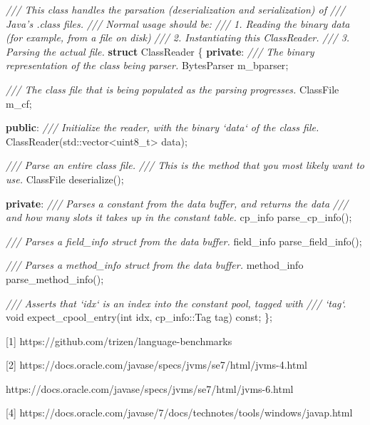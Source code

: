 \documentclass[]{article}
\newenvironment{Shaded}{}{}
\newcommand{\KeywordTok}[1]{\textcolor[rgb]{0.00,0.44,0.13}{\textbf{#1}}}
\newcommand{\DataTypeTok}[1]{\textcolor[rgb]{0.56,0.13,0.00}{#1}}
\newcommand{\CommentTok}[1]{\textcolor[rgb]{0.38,0.63,0.69}{\textit{#1}}}
\newcommand{\VariableTok}[1]{\textcolor[rgb]{0.10,0.09,0.49}{#1}}
\newcommand{\BuiltInTok}[1]{#1}
\newcommand{\AttributeTok}[1]{\textcolor[rgb]{0.49,0.56,0.16}{#1}}
\newcommand{\NormalTok}[1]{#1}
\begin{document}
\begin{Shaded}
\begin{Highlighting}[]
\CommentTok{/// This class handles the parsation (deserialization and serialization) of}
\CommentTok{/// Java's .class files.}
\CommentTok{/// Normal usage should be:}
\CommentTok{/// 1. Reading the binary data (for example, from a file on disk)}
\CommentTok{/// 2. Instantiating this ClassReader.}
\CommentTok{/// 3. Parsing the actual file.}
\KeywordTok{struct}\NormalTok{ ClassReader \{}
  \KeywordTok{private}\NormalTok{:}
    \CommentTok{/// The binary representation of the class being parser.}
\NormalTok{    BytesParser }\VariableTok{m_bparser}\NormalTok{;}

    \CommentTok{/// The class file that is being populated as the parsing progresses.}
\NormalTok{    ClassFile }\VariableTok{m_cf}\NormalTok{;}

  \KeywordTok{public}\NormalTok{:}
    \CommentTok{/// Initialize the reader, with the binary `data` of the class file.}
\NormalTok{    ClassReader(}\BuiltInTok{std::}\NormalTok{vector<}\DataTypeTok{uint8_t}\NormalTok{> data);}

    \CommentTok{/// Parse an entire class file.}
    \CommentTok{/// This is the method that you most likely want to use.}
\NormalTok{    ClassFile deserialize();}

  \KeywordTok{private}\NormalTok{:}
    \CommentTok{/// Parses a constant from the data buffer, and returns the data}
    \CommentTok{/// and how many slots it takes up in the constant table.}
\NormalTok{    cp_info parse_cp_info();}

    \CommentTok{/// Parses a field_info struct from the data buffer.}
\NormalTok{    field_info parse_field_info();}

    \CommentTok{/// Parses a method_info struct from the data buffer.}
\NormalTok{    method_info parse_method_info();}

    \CommentTok{/// Asserts that `idx` is an index into the constant pool, tagged with}
    \CommentTok{/// `tag`.}
    \DataTypeTok{void}\NormalTok{ expect_cpool_entry(}\DataTypeTok{int}\NormalTok{ idx, cp_info::Tag tag) }\AttributeTok{const}\NormalTok{;}
\NormalTok{\};}
\end{Highlighting}
\end{Shaded}

{[}1{]} https://github.com/trizen/language-benchmarks

{[}2{]} https://docs.oracle.com/javase/specs/jvms/se7/html/jvms-4.html

https://docs.oracle.com/javase/specs/jvms/se7/html/jvms-6.html

{[}4{]}
https://docs.oracle.com/javase/7/docs/technotes/tools/windows/javap.html
\end{document}
